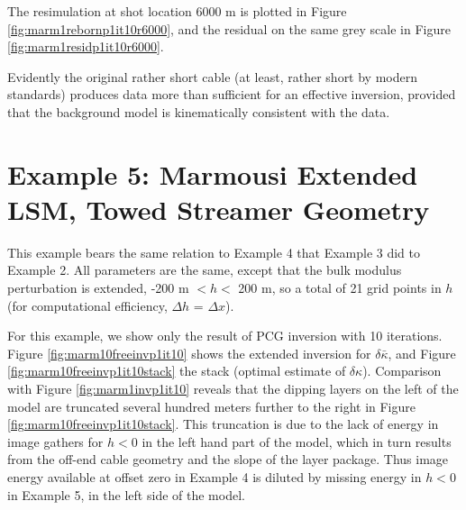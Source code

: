The resimulation at shot location 6000
m is plotted in Figure \ref{fig:marm1rebornp1it10r6000}, and the
residual on the same grey scale in Figure \ref{fig:marm1residp1it10r6000}.


Evidently the original rather short cable (at least, rather short by
modern standards) produces data more than sufficient for an effective
inversion, provided that the background model is kinematically
consistent with the data.

\newpage

\section{Example 5: Marmousi Extended LSM, Towed Streamer Geometry}
This example bears the same relation to Example 4 that Example 3 did
to Example 2. All parameters are the same, except that the bulk
modulus perturbation is extended, -200 m $< h < $ 200 m, so a total of
21 grid points in $h$ (for computational efficiency, $\Delta h$ =
$\Delta x$).

For this example, we show only the result of PCG inversion with 10
iterations. Figure \ref{fig:marm10freeinvp1it10} shows the extended
inversion for $\delta \bar{\kappa}$, and Figure
\ref{fig:marm10freeinvp1it10stack} the stack (optimal estimate of $\delta
\kappa$). Comparison with Figure \ref{fig:marm1invp1it10} reveals that
the dipping layers on the left of the model are truncated several
hundred meters further to the right in Figure
\ref{fig:marm10freeinvp1it10stack}. This truncation is due to the lack of
energy in image gathers for $h<0$ in the left hand part of the model,
which in turn results from the off-end cable geometry and the slope of
the layer package. Thus image energy available at offset zero in Example
4 is diluted by missing energy in $h<0$ in Example 5, in the left
side of the model.


